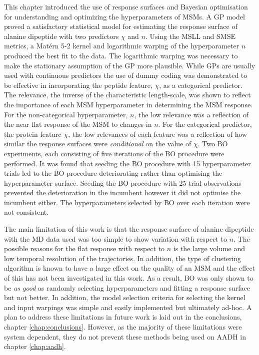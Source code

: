 This chapter introduced the use of response surfaces and Bayesian optimisation for understanding and optimizing the hyperparameters of MSMs. A GP model proved a satisfactory statistical model for estimating the response surface of alanine dipeptide with two predictors $\chi$ and $n$. Using the MSLL and SMSE metrics, a Mat\'{e}rn 5-2 kernel and logarithmic warping of the hyperparameter $n$ produced the best fit to the data.  The logarithmic warping was necessary to make the stationary assumption of the GP more plausible. While GPs are usually used with continuous predictors the use of dummy coding  was demonstrated to be effective in incorporating the peptide feature, $\chi$, as a categorical predictor. The relevance, the inverse of the characteristic length-scale,  was shown to reflect the importance of each  MSM hyperparameter in determining the MSM response. For the non-categorical hyperparameter, $n$, the low relevance was a reflection of the near flat response of the MSM to changes in $n$. For the categorical predictor, the protein feature $\chi$, the low relevances of each feature was a reflection of how similar the response surfaces were \emph{conditional} on the value of $\chi$.  Two BO experiments, each consisting of five iterations of the BO procedure were performed. It was found that seeding the BO procedure with 15 hyperparameter trials led to the BO procedure deteriorating rather than optimising the hyperparameter surface. Seeding the BO procedure with 25 trial observations prevented the deterioration in the incumbent however it did not optimise the incumbent either. The hyperparameters selected by BO over each iteration were not consistent. 

The main limitation of this work is that the response surface of alanine dipeptide with the MD data used was too simple to show variation with respect to $n$.  The possible reasons for the flat response with respect to $n$ is the large volume and low temporal resolution of the trajectories. In addition, the type of clustering algorithm is known to have a large effect on the quality of an MSM \cite{husicWardClusteringImproves2017a} and the effect of this has not been investigated in this work. As a result, BO was only shown to be \emph{as good} as randomly selecting hyperparameters and fitting a response surface but not better. In addition, the model selection criteria for selecting the kernel and input warpings was simple and easily implemented but ultimately ad-hoc. A plan to address these limitations in future work is laid out in the conclusions, chapter \ref{chap:conclusions}. However, as the majority of these limitations were system dependent, they do not prevent these methods being used on AADH in chapter \ref{chap:aadh}. 

